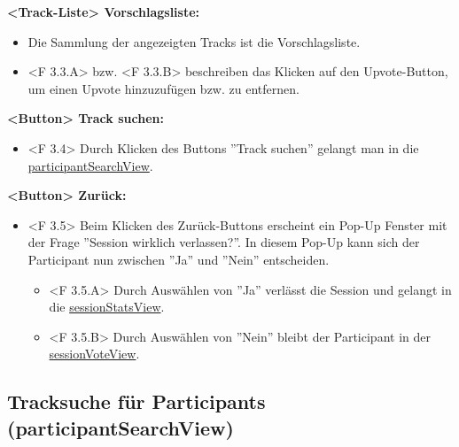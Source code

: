 \documentclass[oneside, ngerman]{sdqtechreport}
\begin{document}
\textbf{<Track-Liste> Vorschlagsliste:}
\begin{itemize}
    \item Die Sammlung der angezeigten Tracks ist die Vorschlagsliste.
    \hypertarget{<F 3.3.A>}{} 
    \hypertarget{<F 3.3.B>}{}
    \item <F 3.3.A> bzw. <F 3.3.B> beschreiben das Klicken auf den Upvote-Button, um einen Upvote hinzuzufügen bzw. zu entfernen.
\end{itemize}

\textbf{<Button> Track suchen:}
\begin{itemize}
    \hypertarget{<F 3.4>}{}
    \item <F 3.4> Durch Klicken des Buttons ''Track suchen'' gelangt man in die \hyperlink{participantSearchView}{participantSearchView}.
\end{itemize}

\textbf{<Button> Zurück:}
\begin{itemize}
    \hypertarget{<F 3.5>}{}
    \item <F 3.5> Beim Klicken des Zurück-Buttons erscheint ein Pop-Up Fenster mit der Frage ''Session wirklich verlassen?''. In diesem Pop-Up kann sich der Participant nun zwischen ''Ja'' und ''Nein'' entscheiden.
    \begin{itemize}
        \hypertarget{<F 3.5.A>}{}
        \item <F 3.5.A> Durch Auswählen von ''Ja'' verlässt die Session und gelangt in die \hyperlink{sessionStatsView}{sessionStatsView}.
        \item \hypertarget{<F 3.5.B>}{} <F 3.5.B> Durch Auswählen von ''Nein'' bleibt der Participant in der \hyperlink{sessionVoteView}{sessionVoteView}.
    \end{itemize}
\end{itemize}

\subsection{Tracksuche für Participants (participantSearchView)}
\label{sec:Benutzeroberfläche:participantSearchView}
\end{document}
